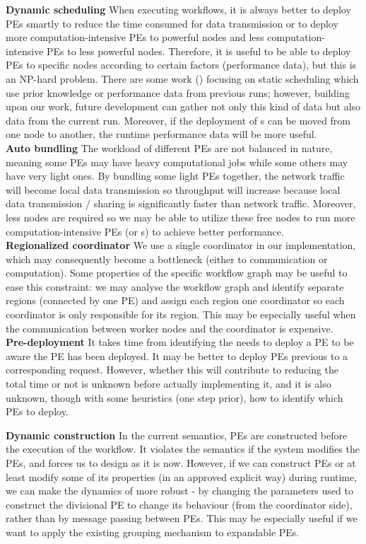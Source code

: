 \textbf{Dynamic scheduling}\quad
When executing workflows, it is always better to deploy PEs smartly to reduce the time consumed for data transmission or to deploy more computation-intensive PEs to powerful nodes and less computation-intensive PEs to less powerful nodes. Therefore, it is useful to be able to deploy PEs to specific nodes according to certain factors (\eg performance data), but this is an NP-hard problem. There are some work (\eg \cite{teylo2017hybrid}) focusing on static scheduling which use prior knowledge or performance data from previous runs; however, building upon our work, future development can gather not only this kind of data but also data from the current run. Moreover, if the deployment of \tPEInst{}s can be moved from one node to another, the runtime performance data will be more useful. \\

\textbf{Auto bundling}\quad
The workload of different PEs are not balanced in nature, meaning some PEs may have heavy computational jobs while some others may have very light ones. By bundling some light PEs together, the network traffic will become local data transmission so throughput will increase because local data transmission / sharing is significantly faster than network traffic. Moreover, less nodes are required so we may be able to utilize these free nodes to run more computation-intensive PEs (or \tPEDup{}s) to achieve better performance. \\

\textbf{Regionalized coordinator}\quad
We use a single coordinator in our implementation, which may consequently become a bottleneck (either to communication or computation). Some properties of the specific workflow graph may be useful to ease this constraint: we may analyse the workflow graph and identify separate regions (\eg connected by one PE) and assign each region one coordinator so each coordinator is only responsible for its region. This may be especially useful when the communication between worker nodes and the coordinator is expensive. \\

\textbf{Pre-deployment}\quad
It takes time from identifying the needs to deploy a PE to be aware the PE has been deployed. It may be better to deploy PEs previous to a corresponding request. However, whether this will contribute to reducing the total time or not is unknown before actually implementing it, and it is also unknown, though with some heuristics (\eg one step prior), how to identify which PEs to deploy.

\textbf{Dynamic construction}\quad
In the current \dpy semantics, PEs are constructed before the execution of the workflow. It violates the semantics if the system modifies the PEs, and forces us to design \tdynexp as it is now. However, if we can construct PEs or at least modify some of its properties (in an approved explicit way) during runtime, we can make the dynamics of \tdynexp more robust - by changing the parameters used to construct the divisional PE to change its behaviour (from the coordinator side), rather than by message passing between PEs. This may be especially useful if we want to apply the existing grouping mechanism to expandable PEs.
